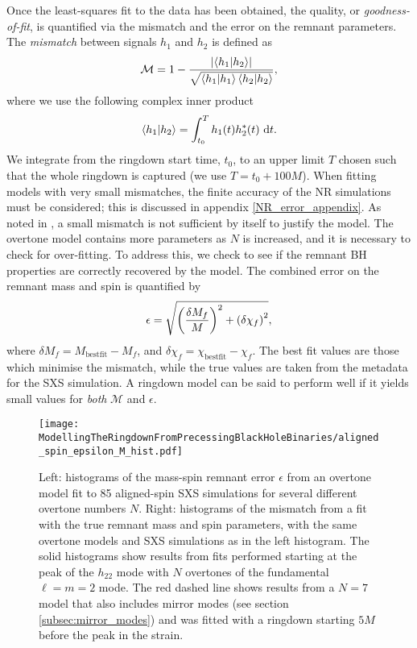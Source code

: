 Once the least-squares fit to the data has been obtained, the quality, or \emph{goodness-of-fit}, is quantified via the mismatch and the error on the remnant parameters.
The \emph{mismatch} between signals $h_1$ and $h_2$ is defined as
\begin{equation}\label{mismatch}
    \mathcal{M} = 1 - \frac{\abs{ \braket{h_1}{h_2} }}{\sqrt{\braket{h_1}\braket{h_2}}},
\end{equation}
where we use the following complex inner product \cite{1999JMP....40..980N}
\begin{equation} \label{eq:inner_prod}
    \braket{h_1}{h_2} = \int_{t_0}^T h_1(t) h^*_2(t) ~ \dd t.
\end{equation}
We integrate from the ringdown start time, $t_0$, to an upper limit $T$ chosen such that the whole ringdown is captured (we use $T = t_0 + 100M$).
When fitting models with very small mismatches, the finite accuracy of the NR simulations must be considered; this is discussed in appendix \ref{NR_error_appendix}.
As noted in \cite{overtones}, a small mismatch is not sufficient by itself to justify the model.
The overtone model contains more parameters as $N$ is increased, and it is necessary to check for over-fitting.
To address this, we check to see if the remnant BH properties are correctly recovered by the model. 
The combined error on the remnant mass and spin is quantified by \cite{overtones}
\begin{equation} \label{eq:epsilon}
    \epsilon = \sqrt{ \qty( \frac{\delta M_f}{M} )^2 + \qty( \delta\chi_f )^2 },
\end{equation}
where $\delta M_f = M_{\mathrm{best fit}} - M_f$, and $\delta \chi_f = \chi_{\mathrm{best fit}} - \chi_f$. 
The best fit values are those which minimise the mismatch, while the true values are taken from the metadata for the SXS simulation.
A ringdown model can be said to perform well if it yields small values for \emph{both} $\mathcal{M}$ and $\epsilon$.

\begin{figure*}[t]
    \centering
    \texttt{[image: ModellingTheRingdownFromPrecessingBlackHoleBinaries/aligned\_spin\_epsilon\_M\_hist.pdf]}
    \caption[Remnant error and mismatches for fits to aligned-spin SXS simulations using an overtone model]{Left: histograms of the mass-spin remnant error $\epsilon$ from an overtone model fit to 85 aligned-spin SXS simulations for several different overtone numbers $N$. 
    Right: histograms of the mismatch from a fit with the true remnant mass and spin parameters, with the same overtone models and SXS simulations as in the left histogram.
    The solid histograms show results from fits performed starting at the peak of the $h_{22}$ mode with $N$ overtones of the fundamental $\ell = m = 2$ mode.
    The red dashed line shows results from a $N=7$ model that also includes mirror modes (see section \ref{subsec:mirror_modes}) and was fitted with a ringdown starting $5M$ before the peak in the strain.}
    \label{aligned_spin_epsilon_hist}
\end{figure*}

